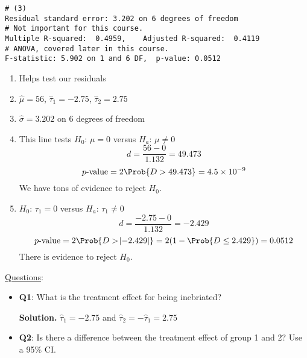 \begin{Example}{}{}
\begin{itemize}
\begin{verbatim}
# (3)
Residual standard error: 3.202 on 6 degrees of freedom
# Not important for this course.
Multiple R-squared:  0.4959,    Adjusted R-squared:  0.4119
# ANOVA, covered later in this course.
F-statistic: 5.902 on 1 and 6 DF,  p-value: 0.0512
\end{verbatim}
    \end{itemize}
    \begin{enumerate}[(1)]
        \item Helps test our residuals
        \item $ \hat{\mu}=56 $, $ \hat{\tau}_1=-2.75 $, $ \hat{\tau}_2=2.75 $
        \item $ \hat{\sigma}=3.202 $ on 6 degrees of freedom
        \item This line tests $ H_0 $: $ \mu=0 $ versus $ H_a $: $ \mu\ne 0 $
              \[ d=\frac{56-0}{1.132} =49.473 \]
              \[ p\text{-value}=2\Prob{D>49.473}=4.5\times 10^{-9} \]
              We have tons of evidence to reject $ H_0 $.
        \item $ H_0 $: $ \tau_1=0 $ versus $ H_a $: $ \tau_1\ne 0 $
              \[ d=\frac{-2.75-0}{1.132} =-2.429 \]
              \[ p\text{-value}=2\Prob{D>\abs{-2.429}}=2(1-\Prob{D\le 2.429})=0.0512 \]
              There is evidence to reject $ H_0 $.
    \end{enumerate}
    \underline{Questions}:
    \begin{itemize}
        \item \textbf{Q1}: What is the treatment effect for being inebriated?

              \textbf{Solution.} $ \hat{\tau}_1=-2.75 $ and $ \hat{\tau}_2=-\hat{\tau}_1=2.75 $
        \item \textbf{Q2}: Is there a difference between the treatment effect of group 1 and 2? Use a 95\% CI\@.


\end{itemize}
\end{Example}
